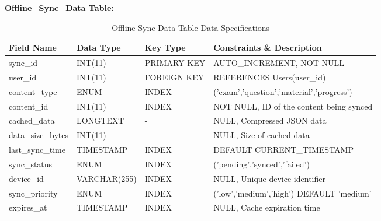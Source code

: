 \documentclass[12pt,a4paper,oneside]{book}
\begin{document}
\textbf{Offline\_Sync\_Data Table:}
\begin{table}[H]
\centering
\caption{Offline Sync Data Table Data Specifications}
\footnotesize
\begin{tabular}{|L{3cm}|L{2.5cm}|L{1.5cm}|L{5cm}|}
\hline
\textbf{Field Name} & \textbf{Data Type} & \textbf{Key Type} & \textbf{Constraints \& Description} \\
\hline
sync\_id & INT(11) & PRIMARY KEY & AUTO\_INCREMENT, NOT NULL \\
\hline
user\_id & INT(11) & FOREIGN KEY & REFERENCES Users(user\_id) \\
\hline
content\_type & ENUM & INDEX & ('exam','question','material','progress') \\
\hline
content\_id & INT(11) & INDEX & NOT NULL, ID of the content being synced \\
\hline
cached\_data & LONGTEXT & - & NULL, Compressed JSON data \\
\hline
data\_size\_bytes & INT(11) & - & NULL, Size of cached data \\
\hline
last\_sync\_time & TIMESTAMP & INDEX & DEFAULT CURRENT\_TIMESTAMP \\
\hline
sync\_status & ENUM & INDEX & ('pending','synced','failed') \\
\hline
device\_id & VARCHAR(255) & INDEX & NULL, Unique device identifier \\
\hline
sync\_priority & ENUM & INDEX & ('low','medium','high') DEFAULT 'medium' \\
\hline
expires\_at & TIMESTAMP & INDEX & NULL, Cache expiration time \\
\hline
\end{tabular}
\end{table}
\end{document}
